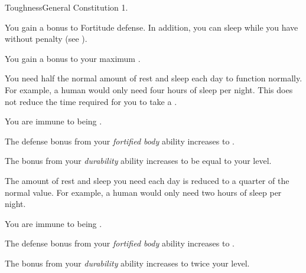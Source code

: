     \begin{feat}{Toughness}{General}
        \featpre Constitution 1.

         You gain a  bonus to Fortitude defense.
        In addition, you can sleep while you have  without penalty (see ).

         You gain a  bonus to your maximum .

         You need half the normal amount of rest and sleep each day to function normally.
        For example, a human would only need four hours of sleep per night.
        This does not reduce the time required for you to take a .

         You are immune to being \dazed.

         The defense bonus from your \textit{fortified body} ability increases to .

         The bonus from your \textit{durability} ability increases to be equal to your level.

         The amount of rest and sleep you need each day is reduced to a quarter of the normal value.
        For example, a human would only need two hours of sleep per night.

         You are immune to being \stunned.

         The defense bonus from your \textit{fortified body} ability increases to .

         The bonus from your \textit{durability} ability increases to twice your level.
    \end{feat}

